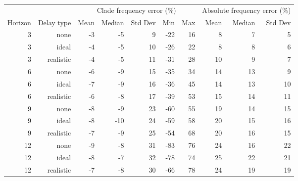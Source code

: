 
\begin{tabular*}{1.0\textwidth}{rrrrrrrrrr}
\toprule
        &            & \multicolumn{5}{c}{Clade frequency error (\%)} & \multicolumn{3}{c}{Absolute frequency error (\%)} \\
Horizon & Delay type & Mean & Median & Std Dev & Min & Max & Mean & Median & Std Dev \\
\midrule

3 & none & -3 & -5 & 9 & -22 & 16 & 8 & 7 & 5 \\
3 & ideal & -4 & -5 & 10 & -26 & 22 & 8 & 8 & 6 \\
3 & realistic & -4 & -5 & 11 & -31 & 28 & 10 & 9 & 7 \\
6 & none & -6 & -9 & 15 & -35 & 34 & 14 & 13 & 9 \\
6 & ideal & -7 & -9 & 16 & -36 & 45 & 14 & 13 & 10 \\
6 & realistic & -6 & -8 & 17 & -39 & 53 & 15 & 14 & 11 \\
9 & none & -8 & -9 & 23 & -60 & 55 & 19 & 14 & 15 \\
9 & ideal & -8 & -10 & 24 & -59 & 58 & 20 & 15 & 16 \\
9 & realistic & -7 & -9 & 25 & -54 & 68 & 20 & 16 & 15 \\
12 & none & -9 & -8 & 31 & -83 & 76 & 24 & 16 & 22 \\
12 & ideal & -8 & -7 & 32 & -78 & 74 & 25 & 22 & 21 \\
12 & realistic & -7 & -8 & 30 & -66 & 78 & 24 & 19 & 19 \\

\bottomrule
\end{tabular*}

